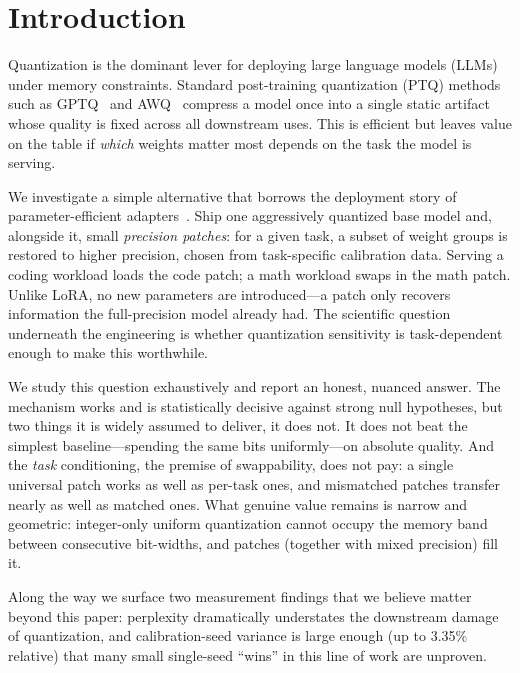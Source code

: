 \documentclass[manuscript, screen, review]{jair}
\begin{document}
\maketitle

\section{Introduction}

Quantization is the dominant lever for deploying large language models (LLMs)
under memory constraints. Standard post-training quantization (PTQ) methods
such as GPTQ~\cite{frantar2022gptq} and AWQ~\cite{lin2023awq} compress a model
once into a single static artifact whose quality is fixed across all
downstream uses. This is efficient but leaves value on the table if
\emph{which} weights matter most depends on the task the model is serving.

We investigate a simple alternative that borrows the deployment story of
parameter-efficient adapters~\cite{hu2021lora}. Ship one aggressively
quantized base model and, alongside it, small \emph{precision patches}: for a
given task, a subset of weight groups is restored to higher precision, chosen
from task-specific calibration data. Serving a coding workload loads the code
patch; a math workload swaps in the math patch. Unlike LoRA, no new parameters
are introduced---a patch only recovers information the full-precision model
already had. The scientific question underneath the engineering is whether
quantization sensitivity is task-dependent enough to make this worthwhile.

We study this question exhaustively and report an honest, nuanced answer. The
mechanism works and is statistically decisive against strong null hypotheses,
but two things it is widely assumed to deliver, it does not. It does not beat
the simplest baseline---spending the same bits uniformly---on absolute quality.
And the \emph{task} conditioning, the premise of swappability, does not pay: a
single universal patch works as well as per-task ones, and mismatched patches
transfer nearly as well as matched ones. What genuine value remains is narrow
and geometric: integer-only uniform quantization cannot occupy the memory band
between consecutive bit-widths, and patches (together with mixed precision)
fill it.

Along the way we surface two measurement findings that we believe matter
beyond this paper: perplexity dramatically understates the downstream damage
of quantization, and calibration-seed variance is large enough (up to 3.35\%
relative) that many small single-seed ``wins'' in this line of work are
unproven.
\end{document}
